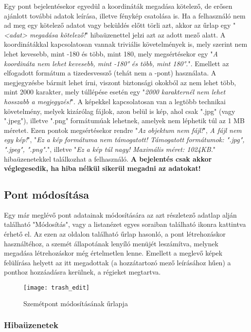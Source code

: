 Egy pont bejelentésekor egyedül a koordináták megadása kötelező, de erősen ajánlott további adatok leírása, illetve fénykép csatolása is. Ha a felhasználó nem ad meg egy kötelező adatot vagy beküldés előtt törli azt, akkor az űrlap egy "\textit{<adat> megadása kötelező!}" hibaüzenettel jelzi azt az adott mező alatt. A koordinátákkal kapcsolatosan vannak triviális követelmények is, mely szerint nem lehet kevesebb, mint -180 és több, mint 180, mely megsértésekor egy "\textit{A koordináta nem lehet kevesebb, mint -180° és több, mint 180°.}". Emellett az elfogadott formátum a tizedesvessző (tehát nem a -pont) használata. A megjegyzésbe bármit lehet írni, viszont biztonsági okokból az nem lehet több, mint 2000 karakter, mely túllépése esetén egy "\textit{2000 karakternél nem lehet hosszabb a megjegyzés!}". A képekkel kapcsolatosan van a legtöbb technikai követelmény, melyek kizárólag fájlok, azon belül is kép, ahol csak ".jpg" (vagy ".jpeg"), illetve ".png" formátumúak lehetnek, amelyek nem léphetik túl az 1 MB méretet. Ezen pontok megsértésekor rendre "\textit{Az objektum nem fájl!}", \textit{A fájl nem egy kép!}", "\textit{Ez a kép formátuma nem támogatott! Támogatott formátumok: ".jpg", ".jpeg", ".png".}", illetve "\textit{Ez a kép túl nagy! Maximális méret: 1024KB.}" hibaüzenetekkel találkozhat a felhasználó. \textbf{A bejelentés csak akkor véglegesedik, ha hiba nélkül sikerül megadni az adatokat!}

\subsection{Pont módosítása}
\label{subsec:trash_edit}

Egy már meglévő pont adatainak módosítására az azt részletező adatlap alján található "Módosítás", vagy a listanézet egyes soraiban található  ikonra kattintva érhető el. Az ezen az oldalon található űrlap hasonló, a pont létrehozáskor használtéhoz, a szemét állapotának lenyíló menüjét leszámítva, melynek megadása létrehozáskor még értelmetlen lenne. Emellett a meglevő képek felülírása helyett az itt megadottak (a hozzátartozó mező leírásához hűen) a ponthoz hozzáadásra kerülnek, a régieket megtartva.

\begin{figure}[H]
	\centering
	\texttt{[image: trash\_edit]}
	\caption{Szemétpont módosításának űrlapja}
	\label{fig:trash_edit}
\end{figure}

\subsubsection{Hibaüzenetek}

